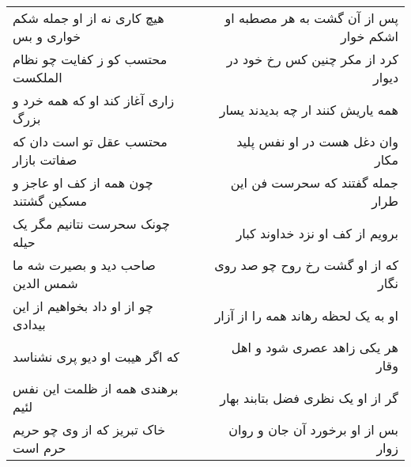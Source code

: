 \begin{center}
\begin{longtable}{l p{0.5cm} r}
\\
هیچ کاری نه از او جمله شکم خواری و بس
&&
پس از آن گشت به هر مصطبه او اشکم خوار
\\
محتسب کو ز کفایت چو نظام الملکست
&&
کرد از مکر چنین کس رخ خود در دیوار
\\
زاری آغاز کند او که همه خرد و بزرگ
&&
همه یاریش کنند ار چه بدیدند یسار
\\
محتسب عقل تو است دان که صفاتت بازار
&&
وان دغل هست در او نفس پلید مکار
\\
چون همه از کف او عاجز و مسکین گشتند
&&
جمله گفتند که سحرست فن این طرار
\\
چونک سحرست نتانیم مگر یک حیله
&&
برویم از کف او نزد خداوند کبار
\\
صاحب دید و بصیرت شه ما شمس الدین
&&
که از او گشت رخ روح چو صد روی نگار
\\
چو از او داد بخواهیم از این بیدادی
&&
او به یک لحظه رهاند همه را از آزار
\\
که اگر هیبت او دیو پری نشناسد
&&
هر یکی زاهد عصری شود و اهل وقار
\\
برهندی همه از ظلمت این نفس لئیم
&&
گر از او یک نظری فضل بتابند بهار
\\
خاک تبریز که از وی چو حریم حرم است
&&
بس از او برخورد آن جان و روان زوار
\\
\end{longtable}
\end{center}
